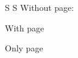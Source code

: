 \documentclass[a5paper]{article}
\begin{document}
\beginnumbering
\pstart
S
\pend
\pstart[\newpage]
S
\pend
\endnumbering
Without page: 

With page 

Only page   
\end{document}
